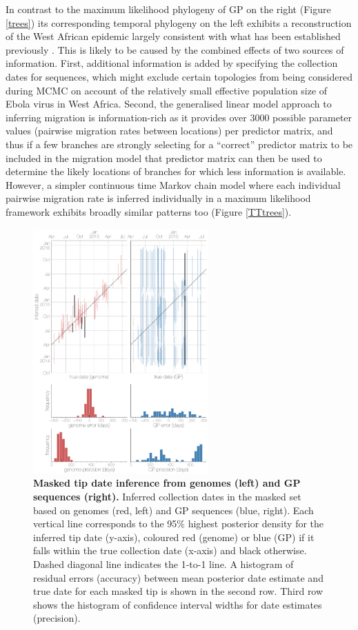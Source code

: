 \documentclass[11pt,oneside,letterpaper]{article}
\begin{document}
In contrast to the maximum likelihood phylogeny of GP on the right (Figure \ref{trees}) its corresponding temporal phylogeny on the left exhibits a reconstruction of the West African epidemic largely consistent with what has been established previously \citep{dudas_virus_2017}.
This is likely to be caused by the combined effects of two sources of information.
First, additional information is added by specifying the collection dates for sequences, which might exclude certain topologies from being considered during MCMC on account of the relatively small effective population size of Ebola virus in West Africa.
Second, the generalised linear model approach to inferring migration is information-rich as it provides over 3000 possible parameter values (pairwise migration rates between locations) per predictor matrix, and thus if a few branches are strongly selecting for a ``correct'' predictor matrix to be included in the migration model that predictor matrix can then be used to determine the likely locations of branches for which less information is available.
However, a simpler continuous time Markov chain model where each individual pairwise migration rate is inferred individually in a maximum likelihood framework exhibits broadly similar patterns too (Figure \ref{TTtrees}).

\begin{figure}[h]
 \centering
	\includegraphics[width=0.6\textwidth]{figures/fig2_dates.png}
	\caption{\textbf{Masked tip date inference from genomes (left) and GP sequences (right).}
  Inferred collection dates in the masked set based on genomes (red, left) and GP sequences (blue, right).
  Each vertical line corresponds to the 95\% highest posterior density for the inferred tip date (y-axis), coloured red (genome) or blue (GP) if it falls within the true collection date (x-axis) and black otherwise.
  Dashed diagonal line indicates the 1-to-1 line.
  A histogram of residual errors (accuracy) between mean posterior date estimate and true date for each masked tip is shown in the second row.
  Third row shows the histogram of confidence interval widths for date estimates (precision).
	}
	\label{dates}
\end{figure}
\end{document}
